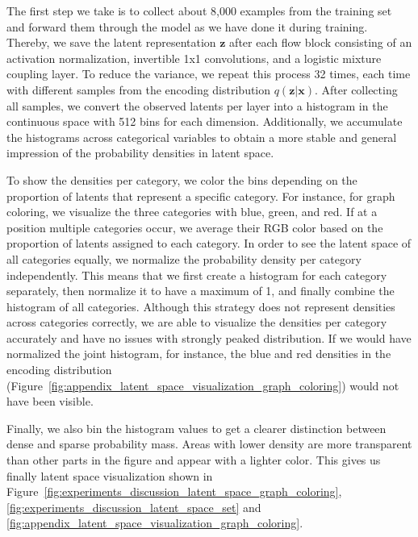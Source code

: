 The first step we take is to collect about 8,000 examples from the training set and forward them through the model as we have done it during training.
Thereby, we save the latent representation $\bm{z}$ after each flow block consisting of an activation normalization, invertible 1x1 convolutions, and a logistic mixture coupling layer.
To reduce the variance, we repeat this process 32 times, each time with different samples from the encoding distribution $q(\bm{z}|\bm{x})$.
After collecting all samples, we convert the observed latents per layer into a histogram in the continuous space with 512 bins for each dimension.
Additionally, we accumulate the histograms across categorical variables to obtain a more stable and general impression of the probability densities in latent space.

To show the densities per category, we color the bins depending on the proportion of latents that represent a specific category. 
For instance, for graph coloring, we visualize the three categories with blue, green, and red. 
If at a position multiple categories occur, we average their RGB color based on the proportion of latents assigned to each category.
In order to see the latent space of all categories equally, we normalize the probability density per category independently.
This means that we first create a histogram for each category separately, then normalize it to have a maximum of 1, and finally combine the histogram of all categories.
Although this strategy does not represent densities across categories correctly, we are able to visualize the densities per category accurately and have no issues with strongly peaked distribution.
If we would have normalized the joint histogram, for instance, the blue and red densities in the encoding distribution (Figure~\ref{fig:appendix_latent_space_visualization_graph_coloring}) would not have been visible.

Finally, we also bin the histogram values to get a clearer distinction between dense and sparse probability mass.
Areas with lower density are more transparent than other parts in the figure and appear with a lighter color.
This gives us finally latent space visualization shown in Figure~\ref{fig:experiments_discussion_latent_space_graph_coloring}, \ref{fig:experiments_discussion_latent_space_set} and \ref{fig:appendix_latent_space_visualization_graph_coloring}.

